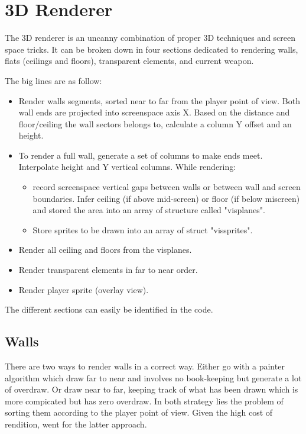 \section{3D Renderer}
The 3D renderer is an uncanny combination of proper 3D techniques and screen space tricks. It can be broken down in four sections dedicated to rendering walls, flats (ceilings and floors), transparent elements, and current weapon.\\
\par
The big lines are as follow:\\
\par
\begin{itemize}
\item Render walls segments, sorted near to far from the player point of view. Both wall ends are projected into screenspace axis X. Based on the distance and floor/ceiling the wall sectors belongs to, calculate a column Y offset and an height. 
\item To render a full wall, generate a set of columns to make ends meet. Interpolate height and Y vertical columns. While rendering:
   \begin{itemize}
     \item record screenspace vertical gaps between walls or between wall and screen boundaries. Infer ceiling (if above mid-screen) or floor (if below miscreen) and stored the area into an array of structure called "visplanes".
     \item Store sprites to be drawn into an array of struct "vissprites".
   \end{itemize}      
\item Render all ceiling and floors from the visplanes.
\item Render transparent elements in far to near order.
\item Render player sprite (overlay view).
\end{itemize}
\par
The different sections can easily be identified in the code.\\
\par
{}


\subsection{Walls}
There are two ways to render walls in a correct way. Either go with a painter algorithm which draw far to near and involves no book-keeping but generate a lot of overdraw. Or draw near to far, keeping track of what has been drawn which is more compicated but has zero overdraw. In both strategy lies the problem of sorting them according to the player point of view. Given the high cost of rendition, \doom went for the latter approach.\\
\par

